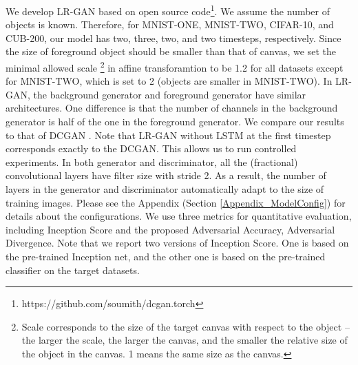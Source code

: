 \documentclass{article} \usepackage{iclr2017_conference,times}
\begin{document}
We develop LR-GAN based on open source code\footnote{https://github.com/soumith/dcgan.torch}. We assume the number of objects is known. Therefore, for MNIST-ONE, MNIST-TWO, CIFAR-10, and CUB-200, our model has two, three, two, and two timesteps, respectively. Since the size of foreground object should be smaller than that of canvas, we set the minimal allowed scale \footnote{Scale corresponds to the size of the target canvas with respect to the object -- the larger the scale, the larger the canvas, and the smaller the relative size of the object in the canvas. 1 means the same size as the canvas.} in affine transforamtion to be 1.2 for all datasets except for MNIST-TWO, which is set to 2 (objects are smaller in MNIST-TWO). In LR-GAN, the background generator and foreground generator have similar architectures. One difference is that the number of channels in the background generator is half of the one in the foreground generator. We compare our results to that of DCGAN \citep{DCGAN}. Note that LR-GAN without LSTM at the first timestep corresponds exactly to the DCGAN. This allows us to run controlled experiments. In both generator and discriminator, all the (fractional) convolutional layers have  filter size with stride 2. As a result, the number of layers in the generator and discriminator automatically adapt to the size of training images. Please see the Appendix (Section \ref{Appendix_ModelConfig}) for details about the configurations. We use three metrics for quantitative evaluation, including Inception Score \citep{ImprovedGAN} and the proposed Adversarial Accuracy, Adversarial Divergence. Note that we report two versions of Inception Score. One is based on the pre-trained Inception net, and the other one is based on the pre-trained classifier on the target datasets.
\end{document}

